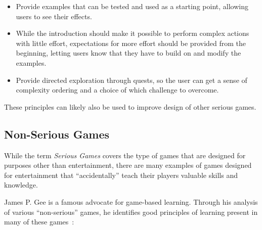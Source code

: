 \begin{itemize}
	\item Provide examples that can be tested and used as a starting point, allowing users to see their effects.
	\item While the introduction should make it possible to perform complex actions with little effort, expectations for more effort should be provided from the beginning, letting users know that they have to build on and modify the examples.
	\item Provide directed exploration through quests, so the user can get a sense of complexity ordering and a choice of which challenge to overcome.
\end{itemize}

\noindent
These principles can likely also be used to improve design of other serious games.

\subsection{Non-Serious Games}
\label{sec:non-serious_games}
While the term \emph{Serious Games} covers the type of games that are designed for purposes other than entertainment, there are many examples of games designed for entertainment that ``accidentally'' teach their players valuable skills and knowledge.

\noindent
James P. Gee is a famous advocate for game-based learning. Through his analysis of various ``non-serious'' games, he identifies good principles of learning present in many of these games~\cite{gee:learning_machines}:

